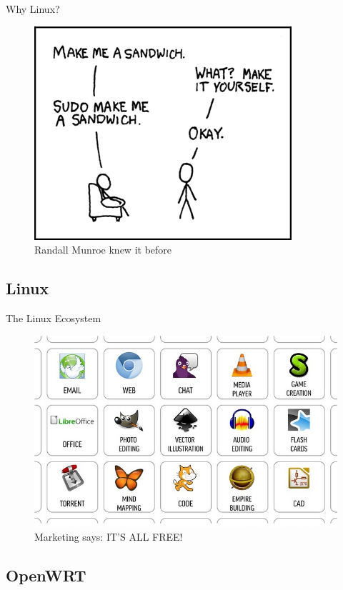 \documentclass[hyperref={unicode}]{beamer}
\begin{document}
\begin{frame}{Why Linux?}
	\begin{figure}
	\includegraphics[width=.7\textwidth]{sandwich.png}
	\caption{Randall Munroe knew it before}
	\end{figure}
\end{frame}

\subsection{Linux}

\begin{frame}{The Linux Ecosystem}
	\begin{figure}
	\includegraphics[width=.75\textwidth]{linux-apps.jpg}
	\caption{Marketing says: IT'S ALL FREE!}
	\end{figure}
\end{frame}

\subsection{OpenWRT}
\end{document}
